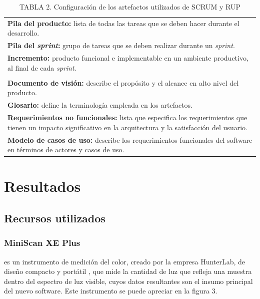 \documentclass[conference]{IEEEtran}
\begin{document}
		\FloatBarrier %
		\begin{table}[htb]
			\caption{TABLA 2. Configuraci\'{o}n de los artefactos utilizados de SCRUM y RUP}
			\label{tabla_2}
			\centering
			\setlength{\extrarowheight}{2.5pt}
			\begin{tabulary}{8.8cm}{|J|}
				\hline
				\\ \hline
				\textbf{Pila del producto: }lista de todas las tareas que se deben hacer durante el desarrollo.\\ \hline
				\textbf{Pila del \textit{sprint}: }grupo de tareas que se deben realizar durante un \textit{sprint}.\\ \hline
				\textbf{Incremento: }producto funcional e implementable en un ambiente productivo, al final de cada \textit{sprint}.\\ \hline
				\\ \hline
				\textbf{Documento de visi\'{o}n: }describe el prop\'{o}sito y el alcance en alto nivel del producto.\\
\hline
				\textbf{Glosario: }define la terminolog\'{i}a empleada en los artefactos.\\ \hline
				\textbf{Requerimientos no funcionales: }lista que especifica los requerimientos que tienen un impacto significativo en la arquitectura y la satisfacci\'{o}n del usuario.\\ \hline
		\textbf{Modelo de casos de uso: }describe los requerimientos funcionales del software en t\'{e}rminos de actores y casos de uso.\\ \hline
			\end{tabulary}
		\end{table}
		\FloatBarrier %


\section{Resultados}	

	\subsection{Recursos utilizados}
	
		\subsubsection{MiniScan XE Plus}
		es un instrumento de medici\'{o}n del color, creado por la empresa HunterLab, de dise\~{n}o compacto y port\'{a}til \cite{MiniScanXEPlus-manual}, que mide la cantidad de luz que refleja una muestra dentro del espectro de luz visible, cuyos datos resultantes son el insumo principal del nuevo software. Este instrumento se puede apreciar en la figura 3.
\end{document}
